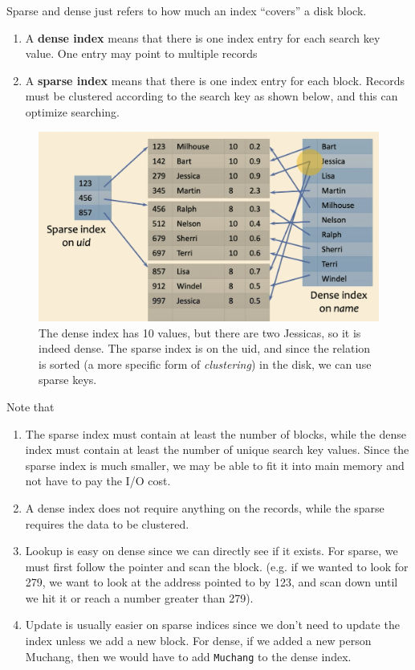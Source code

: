 \documentclass{article}
\begin{document}
    \begin{definition}
      Sparse and dense just refers to how much an index ``covers'' a disk block. 
      \begin{enumerate}
        \item A \textbf{dense index} means that there is one index entry for each search key value. One entry may point to multiple records
        \item A \textbf{sparse index} means that there is one index entry for each block. Records must be clustered according to the search key as shown below, and this can optimize searching. 
      \end{enumerate}

      \begin{figure}[H]
        \centering 
        \includegraphics[scale=0.4]{img/dense_sparse.png}
        \caption{The dense index has 10 values, but there are two Jessicas, so it is indeed dense. The sparse index is on the uid, and since the relation is sorted (a more specific form of \textit{clustering}) in the disk, we can use sparse keys.} 
        \label{fig:dense_sparse}
      \end{figure}

      Note that 
      \begin{enumerate}
        \item The sparse index must contain at least the number of blocks, while the dense index must contain at least the number of unique search key values. Since the sparse index is much smaller, we may be able to fit it into main memory and not have to pay the I/O cost. 
        \item A dense index does not require anything on the records, while the sparse requires the data to be clustered. 
        \item Lookup is easy on dense since we can directly see if it exists. For sparse, we must first follow the pointer and scan the block. (e.g. if we wanted to look for 279, we want to look at the address pointed to by 123, and scan down until we hit it or reach a number greater than 279). 
        \item Update is usually easier on sparse indices since we don't need to update the index unless we add a new block. For dense, if we added a new person Muchang, then we would have to add \texttt{Muchang} to the dense index. 
      \end{enumerate}
    \end{definition}
\end{document}
